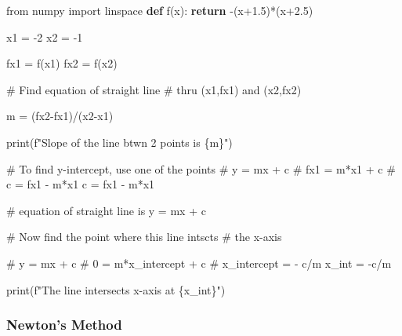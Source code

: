 \documentclass[
  letterpaper,
  DIV=11,
  numbers=noendperiod]{scrartcl}
\newenvironment{Shaded}{\begin{snugshade}}{\end{snugshade}}
\newcommand{\BuiltInTok}[1]{\textcolor[rgb]{0.00,0.23,0.31}{#1}}
\newcommand{\CommentTok}[1]{\textcolor[rgb]{0.37,0.37,0.37}{#1}}
\newcommand{\ControlFlowTok}[1]{\textcolor[rgb]{0.00,0.23,0.31}{\textbf{#1}}}
\newcommand{\DecValTok}[1]{\textcolor[rgb]{0.68,0.00,0.00}{#1}}
\newcommand{\FloatTok}[1]{\textcolor[rgb]{0.68,0.00,0.00}{#1}}
\newcommand{\ImportTok}[1]{\textcolor[rgb]{0.00,0.46,0.62}{#1}}
\newcommand{\KeywordTok}[1]{\textcolor[rgb]{0.00,0.23,0.31}{\textbf{#1}}}
\newcommand{\NormalTok}[1]{\textcolor[rgb]{0.00,0.23,0.31}{#1}}
\newcommand{\OperatorTok}[1]{\textcolor[rgb]{0.37,0.37,0.37}{#1}}
\newcommand{\SpecialCharTok}[1]{\textcolor[rgb]{0.37,0.37,0.37}{#1}}
\newcommand{\SpecialStringTok}[1]{\textcolor[rgb]{0.13,0.47,0.30}{#1}}
\begin{document}
\begin{Shaded}
\begin{Highlighting}[]
\ImportTok{from}\NormalTok{ numpy }\ImportTok{import}\NormalTok{ linspace}
\KeywordTok{def}\NormalTok{ f(x):}
    \ControlFlowTok{return} \OperatorTok{{-}}\NormalTok{(x}\OperatorTok{+}\FloatTok{1.5}\NormalTok{)}\OperatorTok{*}\NormalTok{(x}\OperatorTok{+}\FloatTok{2.5}\NormalTok{)}

\NormalTok{x1 }\OperatorTok{=} \OperatorTok{{-}}\DecValTok{2}
\NormalTok{x2 }\OperatorTok{=} \OperatorTok{{-}}\DecValTok{1}

\NormalTok{fx1 }\OperatorTok{=}\NormalTok{ f(x1)}
\NormalTok{fx2 }\OperatorTok{=}\NormalTok{ f(x2)}

\CommentTok{\# Find equation of straight line}
\CommentTok{\# thru (x1,fx1) and (x2,fx2)}

\NormalTok{m }\OperatorTok{=}\NormalTok{ (fx2}\OperatorTok{{-}}\NormalTok{fx1)}\OperatorTok{/}\NormalTok{(x2}\OperatorTok{{-}}\NormalTok{x1)}

\BuiltInTok{print}\NormalTok{(}\SpecialStringTok{f"Slope of the line btwn 2 points is }\SpecialCharTok{\{}\NormalTok{m}\SpecialCharTok{\}}\SpecialStringTok{"}\NormalTok{)}

\CommentTok{\# To find y{-}intercept, use one of the points}
\CommentTok{\# y = mx + c}
\CommentTok{\# fx1 = m*x1 + c}
\CommentTok{\# c = fx1 {-} m*x1}
\NormalTok{c }\OperatorTok{=}\NormalTok{ fx1 }\OperatorTok{{-}}\NormalTok{ m}\OperatorTok{*}\NormalTok{x1}

\CommentTok{\# equation of straight line is y = mx + c}

\CommentTok{\# Now find the point where this line intscts}
\CommentTok{\# the x{-}axis}

\CommentTok{\# y = mx + c}
\CommentTok{\# 0 = m*x\_intercept + c}
\CommentTok{\# x\_intercept = {-} c/m}
\NormalTok{x\_int }\OperatorTok{=} \OperatorTok{{-}}\NormalTok{c}\OperatorTok{/}\NormalTok{m}

\BuiltInTok{print}\NormalTok{(}\SpecialStringTok{f"The line intersects x{-}axis at }\SpecialCharTok{\{}\NormalTok{x\_int}\SpecialCharTok{\}}\SpecialStringTok{"}\NormalTok{)}
\end{Highlighting}
\end{Shaded}

\subsubsection{Newton's Method}\label{newtons-method}
\end{document}
